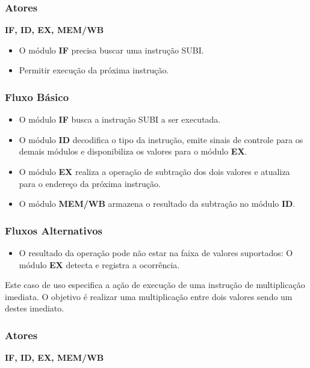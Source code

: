 \subsubsection*{Atores}
\textbf{IF, ID, EX, MEM/WB}

\preconditions 
\begin{itemize}
	\item O módulo \textbf{IF} precisa buscar uma instrução SUBI.
\end{itemize}

\postconditions
\begin{itemize}
	\item Permitir execução da próxima instrução.
\end{itemize}

\subsubsection*{Fluxo Básico}
\begin{itemize}
	\item O módulo \textbf{IF} busca a instrução SUBI a ser executada.
	\item O módulo \textbf{ID} decodifica o tipo da instrução, emite sinais de controle para os demais módulos e disponibiliza os valores para o módulo \textbf{EX}.
	\item O módulo \textbf{EX} realiza a operação de subtração dos dois valores e atualiza para o endereço da próxima instrução.
	\item O módulo \textbf{MEM/WB} armazena o resultado da subtração no módulo \textbf{ID}.
\end{itemize}

\subsubsection*{Fluxos Alternativos}
\begin{itemize}
	\item O resultado da operação pode não estar na faixa de valores suportados:
	\subitem O módulo \textbf{EX} detecta e registra a ocorrência.
\end{itemize}


Este caso de uso especifica a ação de execução de uma instrução de multiplicação imediata. O objetivo é realizar uma multiplicação entre dois valores sendo um destes imediato.

\subsubsection*{Atores}
\textbf{IF, ID, EX, MEM/WB}

